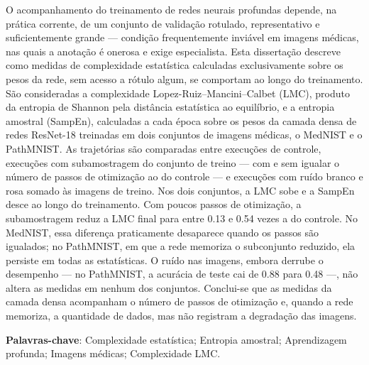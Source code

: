 \begin{resumo}
O acompanhamento do treinamento de redes neurais profundas depende, na prática
corrente, de um conjunto de validação rotulado, representativo e suficientemente
grande --- condição frequentemente inviável em imagens médicas, nas quais a
anotação é onerosa e exige especialista. Esta dissertação descreve como medidas
de complexidade estatística calculadas exclusivamente sobre os pesos da rede,
sem acesso a rótulo algum, se comportam ao longo do treinamento. São
consideradas a complexidade Lopez-Ruiz--Mancini--Calbet (LMC), produto da
entropia de Shannon pela distância estatística ao equilíbrio, e a entropia
amostral (SampEn), calculadas a cada época sobre os pesos da camada densa de
redes ResNet-18 treinadas em dois conjuntos de imagens médicas, o MedNIST e o
PathMNIST. As trajetórias são comparadas entre execuções de controle, execuções
com subamostragem do conjunto de treino --- com e sem igualar o número de
passos de otimização ao do controle --- e execuções com ruído branco e rosa
somado às imagens de treino. Nos dois conjuntos, a LMC sobe e a SampEn desce ao
longo do treinamento. Com poucos passos de otimização, a subamostragem reduz a
LMC final para entre \num{0,13} e \num{0,54} vezes a do controle. No MedNIST,
essa diferença praticamente desaparece quando os passos são igualados; no
PathMNIST, em que a rede memoriza o subconjunto reduzido, ela persiste em todas
as estatísticas. O ruído nas imagens, embora derrube o desempenho --- no
PathMNIST, a acurácia de teste cai de \num{0,88} para \num{0,48} ---, não altera
as medidas em nenhum dos conjuntos. Conclui-se que as medidas da camada densa
acompanham o número de passos de otimização e, quando a rede memoriza, a
quantidade de dados, mas não registram a degradação das imagens.

\textbf{Palavras-chave}: Complexidade estatística; Entropia amostral;
Aprendizagem profunda; Imagens médicas; Complexidade LMC.
\end{resumo}
